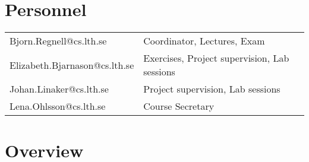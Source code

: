 \documentclass[10pt,a4paper]{article}
\begin{document}
\section{Personnel}
\begin{flushleft}
\setlength{\tabcolsep}{0pt}
\begin{tabular}{p{} p{}}
Bjorn.Regnell@cs.lth.se & Coordinator, Lectures, Exam \\
Elizabeth.Bjarnason@cs.lth.se & Exercises, Project supervision, Lab sessions \\
Johan.Linaker@cs.lth.se & Project supervision, Lab sessions \\
Lena.Ohlsson@cs.lth.se & Course Secretary \\
\end{tabular}
\end{flushleft}




\newpage
\section{Overview}
\end{document}
